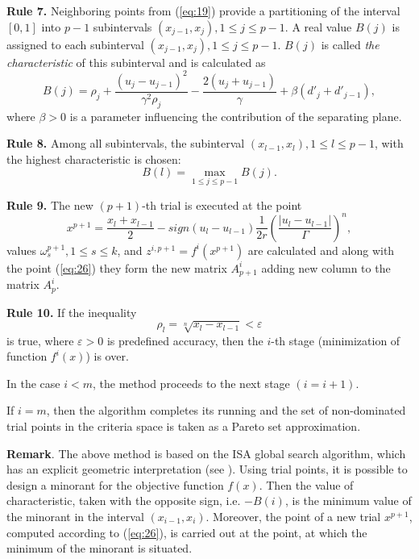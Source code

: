 \documentclass[runningheads]{llncs}
\begin{document}
\textbf{Rule 7.} Neighboring points from (\ref{eq:19}) provide a partitioning of the interval $[0, 1]$ into $p-1$ subintervals $(x_{j-1}, x_j), 1 \leq j \leq p-1$.
A real value $B(j)$ is assigned to each subinterval $(x_{j-1}, x_j), 1 \leq j \leq p-1$. $B(j)$ is called \textit{the characteristic}  of this subinterval and is calculated as
\begin{equation}
    \label{eq:24}
    B(j) = \rho_j + \frac{(u_j-u_{j-1})^2}{\gamma^2 \rho_j} - \frac{2 (u_j+u_{j-1})}{\gamma} + \beta (d'_j + d'_{j-1}),
\end{equation}
where $\beta > 0$ is a parameter influencing the contribution of the separating plane. 

\textbf{Rule 8.} Among all subintervals, the subinterval $(x_{l-1}, x_l), 1 \leq l \leq p-1$, with the highest characteristic is chosen:
\begin{equation}
    \label{eq:25}
    B(l) = \max_{1 \leq j \leq p-1} {B(j)}.
\end{equation}

\textbf{Rule 9.} The new $(p+1)$-th trial is executed at the point  
\begin{equation}
    \label{eq:26}
    x^{p+1} = \frac{x_l + x_{l-1}}{2} - sign(u_l - u_{l-1}) \frac{1}{2r} \left(\frac{|u_l - u_{l-1}|}{\Gamma} \right)^n,
\end{equation}
values $\omega^{p+1}_s, 1 \leq s \leq k$, and $z^{i,p+1}=f^i(x^{p+1})$  are calculated and along with the point (\ref{eq:26}) they form the new matrix $A^i_{p+1}$ adding new column to the matrix $A^i_p$. 

\textbf{Rule 10.} If the inequality
\begin{equation}
    \label{eq:27}
    \rho_l=\sqrt[n]{x_l-x_{l-1}} < \varepsilon
\end{equation}
is true, where $\varepsilon > 0$ is predefined accuracy, then the $i$-th  stage (minimization of function $f^i(x)$) is over.

In the case $i < m$, the method proceeds to the next stage $(i = i+1)$.  

If $i=m$, then the algorithm completes its running and the set of non-dominated trial points in the criteria space is taken as a Pareto set approximation.

\textbf{Remark}. The above method is based on the ISA  global search algorithm, which has an explicit geometric interpretation (see \cite{Strongin2000}). Using trial points, it is possible to design a minorant for the objective function $f(x)$. Then the value of characteristic, taken with the opposite sign, i.e. $-B(i)$, is the minimum value of the minorant in the interval $(x_{i-1}, x_i)$. Moreover, the point of a new trial $x^{p+1}$, computed according to (\ref{eq:26}), is carried out at the point, at which the minimum of the minorant is situated.
\end{document}
